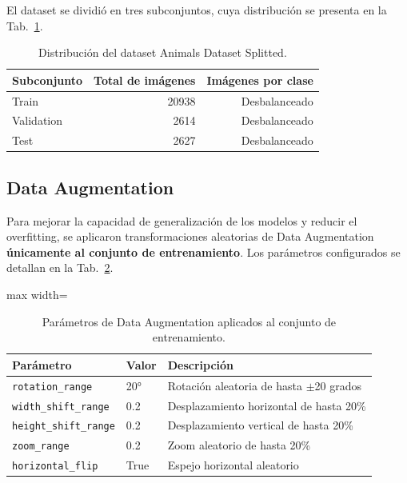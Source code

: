 \documentclass[1p,12pt]{elsarticle}
\begin{document}
El dataset se dividió en tres subconjuntos, cuya distribución se presenta en la
Tab.~\ref{tab:distribucion_dataset}.

\begin{table}[h]
\centering
\begin{tabular}{lrr}
\hline
\textbf{Subconjunto} & \textbf{Total de imágenes} &
\textbf{Imágenes por clase} \\
\hline
Train      & 20938 & Desbalanceado \\
Validation & 2614  & Desbalanceado \\
Test       & 2627  & Desbalanceado \\
\hline
\end{tabular}
\caption{Distribución del dataset Animals Dataset Splitted.}
\label{tab:distribucion_dataset}
\end{table}

\subsection{Data Augmentation}
\label{sub:data_augmentation}

Para mejorar la capacidad de generalización de los modelos y reducir el
overfitting, se aplicaron transformaciones aleatorias de Data
Augmentation~\cite{Shorten2019} \textbf{únicamente al conjunto de
entrenamiento}. Los parámetros configurados se detallan en la
Tab.~\ref{tab:data_augmentation}.

\begin{table}[h]
\centering
\begin{adjustbox}{max width=\textwidth}
\begin{tabular}{lll}
\hline
\textbf{Parámetro} & \textbf{Valor} & \textbf{Descripción} \\
\hline
\texttt{rotation\_range}      & 20°  & Rotación aleatoria de hasta $\pm$20 grados \\
\texttt{width\_shift\_range}  & 0.2  & Desplazamiento horizontal de hasta 20\% \\
\texttt{height\_shift\_range} & 0.2  & Desplazamiento vertical de hasta 20\% \\
\texttt{zoom\_range}          & 0.2  & Zoom aleatorio de hasta 20\% \\
\texttt{horizontal\_flip}     & True & Espejo horizontal aleatorio \\
\hline
\end{tabular}
\end{adjustbox}
\caption{Parámetros de Data Augmentation aplicados al conjunto de entrenamiento.}
\label{tab:data_augmentation}
\end{table}
\end{document}
